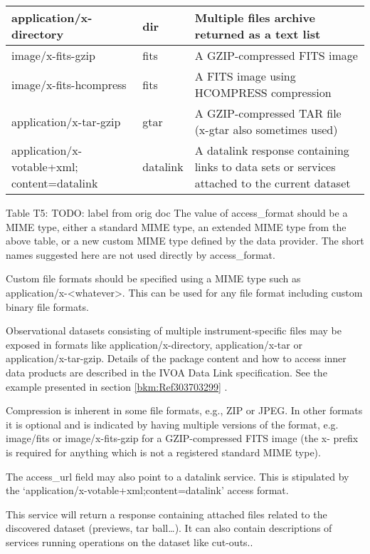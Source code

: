 \documentclass[11pt,a4paper]{ivoa}
\begin{document}
\begin{tabular}{|p{}|p{}|p{}|}
application/x-directory & dir & Multiple files archive returned as a text list \\\hline
image/x-fits-gzip & fits & A GZIP-compressed FITS image\\\hline
image/x-fits-hcompress & fits & A FITS image using HCOMPRESS compression\\\hline
application/x-tar-gzip & gtar & A GZIP-compressed TAR file (x-gtar also sometimes used)\\\hline
application/x-votable+xml; content=datalink & datalink & A datalink response containing links to  data sets or services attached to the current dataset\\\hline
\end{tabular}
\label{bkm:Ref286578377}Table T5: TODO: label from orig doc
The value of access\_format should be a MIME type, either a standard MIME type, an extended MIME type from the above
table, or a new custom MIME type defined by the data provider.  The short names suggested here are not used directly by
access\_format.

Custom file formats should be specified using a MIME type such as
{\textquotedbl}application/x-{\textless}whatever{\textgreater}{\textquotedbl}.  This can be used for any file format
including custom binary file formats.

Observational datasets consisting of multiple instrument-specific files may be exposed in formats like
application/x-directory, application/x-tar or application/x-tar-gzip.  Details of the package content and how to access
inner data products are described in the IVOA Data Link specification\cite{2015ivoa.spec.0617D}. See the example
presented in section \ref{bkm:Ref303703299} .

Compression is inherent in some file formats, e.g., ZIP or JPEG.  In other formats it is optional and is indicated by
having multiple versions of the format, e.g. image/fits or image/x-fits-gzip for a GZIP-compressed FITS image (the
{\textquotedbl}x-{\textquotedbl} prefix is required for anything which is not a registered standard MIME type).

The access\_url field may also point to a datalink service. This is stipulated by the
`application/x-votable+xml;content=datalink' access format. 

This service will return a response containing attached files related to the discovered dataset (previews, tar
ball{\dots}).  It can also contain descriptions of services running operations on the dataset like cut-outs..
\end{document}
